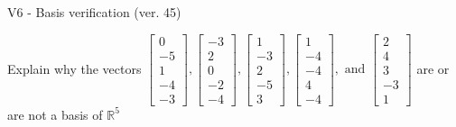 \begin{exercise}
  \begin{exerciseTitle}V6 - Basis verification (ver. 45)\end{exerciseTitle}
  \begin{exerciseStatement}
    Explain why the vectors \(\left[\begin{array}{r}
0 \\
-5 \\
1 \\
-4 \\
-3
\end{array}\right] , \left[\begin{array}{r}
-3 \\
2 \\
0 \\
-2 \\
-4
\end{array}\right] , \left[\begin{array}{r}
1 \\
-3 \\
2 \\
-5 \\
3
\end{array}\right] , \left[\begin{array}{r}
1 \\
-4 \\
-4 \\
4 \\
-4
\end{array}\right] , \text{ and } \left[\begin{array}{r}
2 \\
4 \\
3 \\
-3 \\
1
\end{array}\right]\) are or are not a basis of \(\mathbb{R}^5\)	



\end{exerciseStatement}
\end{exercise}

